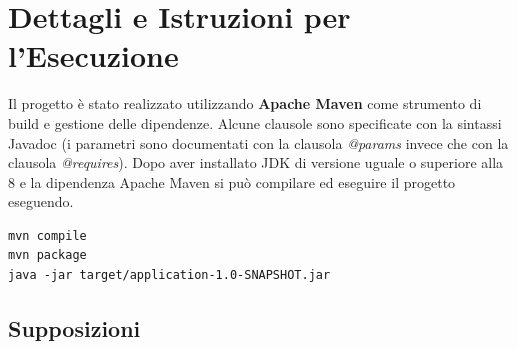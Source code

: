 \documentclass[12pt]{report}
\begin{document}
\tableofcontents

\chapter{Dettagli e Istruzioni per l'Esecuzione}

Il progetto è stato realizzato utilizzando \textbf{Apache Maven} come strumento di build e gestione delle dipendenze.
Alcune clausole sono specificate con la sintassi Javadoc
(i parametri sono documentati con la clausola \textit{@params} invece che con la clausola \textit{@requires}).
Dopo aver installato JDK di versione uguale o superiore alla 8 e la dipendenza Apache Maven
si può compilare ed eseguire il progetto eseguendo.
\begin{lstlisting}
mvn compile
mvn package
java -jar target/application-1.0-SNAPSHOT.jar
\end{lstlisting}

\section{Supposizioni}


\appendix

%
%
\end{document}
